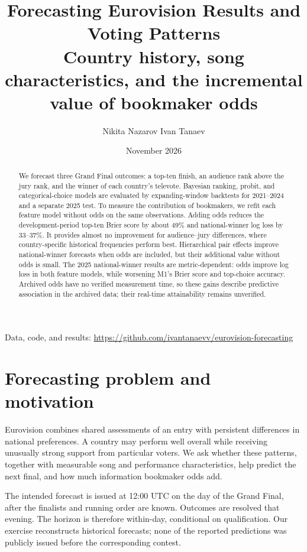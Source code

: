 \documentclass[11pt,a4paper]{article}
\title{Forecasting Eurovision Results and Voting Patterns\\[4pt]\large Country history, song characteristics, and the incremental value of bookmaker odds}
\author{Nikita Nazarov \qquad Ivan Tanaev}
\date{November 2026}
\begin{document}
\maketitle
\begin{center}\small
Data, code, and results: \url{https://github.com/ivantanaevv/eurovision-forecasting}
\end{center}
\begin{abstract}
We forecast three Grand Final outcomes: a top-ten finish, an audience rank above the jury rank, and the winner of each country's televote. Bayesian ranking, probit, and categorical-choice models are evaluated by expanding-window backtests for 2021--2024 and a separate 2025 test. To measure the contribution of bookmakers, we refit each feature model without odds on the same observations. Adding odds reduces the development-period top-ten Brier score by about 49\% and national-winner log loss by 33--37\%. It provides almost no improvement for audience--jury differences, where country-specific historical frequencies perform best. Hierarchical pair effects improve national-winner forecasts when odds are included, but their additional value without odds is small. The 2025 national-winner results are metric-dependent: odds improve log loss in both feature models, while worsening M1's Brier score and top-choice accuracy. Archived odds have no verified measurement time, so these gains describe predictive association in the archived data; their real-time attainability remains unverified.
\end{abstract}

\section{Forecasting problem and motivation}
Eurovision combines shared assessments of an entry with persistent differences in national preferences. A country may perform well overall while receiving unusually strong support from particular voters. We ask whether these patterns, together with measurable song and performance characteristics, help predict the next final, and how much information bookmaker odds add.

The intended forecast is issued at 12:00 UTC on the day of the Grand Final, after the finalists and running order are known. Outcomes are resolved that evening. The horizon is therefore within-day, conditional on qualification. Our exercise reconstructs historical forecasts; none of the reported predictions was publicly issued before the corresponding contest.
\end{document}
